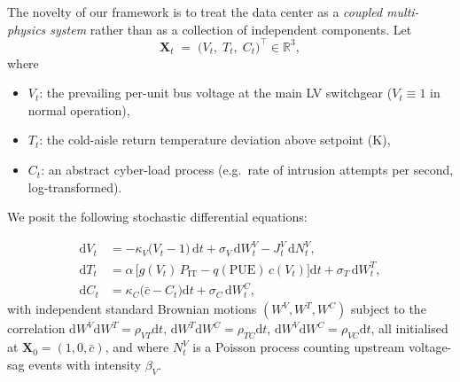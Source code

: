 \documentclass[11pt,a4paper]{article}
\theoremstyle{ia}
\newcommand{\R}{\mathbb{R}}
\newcommand{\1}{\mathbf{1}}
\newcommand{\dd}{\mathrm{d}}
\begin{document}
The novelty of our framework is to treat the data center as a
\emph{coupled multi-physics system} rather than as a collection of
independent components. Let
\begin{equation}\label{eq:state}
   \mathbf{X}_t \;=\;
   \bigl(V_t,\; T_t,\; C_t\bigr)^{\top}\in \R^3,
\end{equation}
where
\begin{itemize}[leftmargin=*,nosep]
  \item $V_t$: the prevailing per-unit bus voltage at the main LV
        switchgear ($V_t\equiv 1$ in normal operation),
  \item $T_t$: the cold-aisle return temperature deviation above setpoint
        (\si{\kelvin}),
  \item $C_t$: an abstract cyber-load process (e.g.\ rate of
        intrusion attempts per second, log-transformed).
\end{itemize}

\noindent We posit the following stochastic differential equations:

\begin{equation}\label{eq:sde}
\boxed{
\begin{aligned}
   \dd V_t &= -\kappa_V\bigl(V_t-1\bigr)\,\dd t
            + \sigma_V\,\dd W^{V}_t
            - J^V_t\,\dd N^{V}_t , \\[2pt]
   \dd T_t &= \alpha\,\bigl[g(V_t)\,P_{\mathrm{IT}}
                            - q(\mathrm{PUE})\,c(V_t)\bigr]\dd t
            + \sigma_T\,\dd W^{T}_t , \\[2pt]
   \dd C_t &= \kappa_C\bigl(\bar c - C_t\bigr)\dd t + \sigma_C\,\dd W^{C}_t,
\end{aligned}}
\end{equation}
with independent standard Brownian motions
$(W^V,W^T,W^C)$ subject to the correlation
$\dd W^{V}\dd W^{T}=\rho_{VT}\dd t$,
$\dd W^{T}\dd W^{C}=\rho_{TC}\dd t$,
$\dd W^{V}\dd W^{C}=\rho_{VC}\dd t$, all initialised at
$\mathbf{X}_0=(1,0,\bar c)$, and where
$N^V_t$ is a Poisson process counting upstream voltage-sag events with
intensity $\beta_V$.
\end{document}
